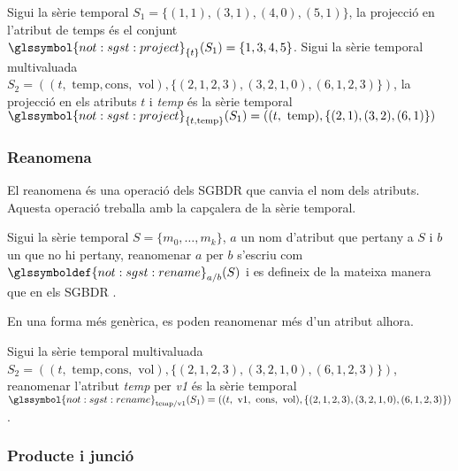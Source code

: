 \begin{example}
  Sigui la sèrie temporal $S_1=\{(1,1),(3,1),(4,0),(5,1)\}$, la
  projecció en l'atribut de temps és el conjunt
  $\glssymbol{not:sgst:project}_{\{t\}}(S_1) = \{ 1,3,4,5 \}$.  Sigui
  la sèrie temporal multivaluada $S_2 = ( (t,\text{ temp},\text{
    cons},\text{ vol}),\{ (2,1,2,3), (3,2,1,0), (6,1,2,3) \})$, la
  projecció en els atributs $t$ i \emph{temp} és la sèrie temporal
  $\glssymbol{not:sgst:project}_{ \{t,\text{temp}\}}(S_1) = (
  (t,\text{ temp}),\{ (2,1), (3,2), (6,1) \})$
\end{example}







\subsubsection{Reanomena}

El reanomena és una operació dels \gls{SGBDR} que canvia el nom dels
atributs.  Aquesta operació treballa amb la
capçalera de la sèrie temporal.


\begin{definition}[Reanomena]
  Sigui la sèrie temporal $S=\{ m_0,\dotsc,m_k\}$, $a$ un nom
  d'atribut que pertany a $S$ i $b$ un que no hi pertany, reanomenar
  $a$ per $b$ s'escriu com $\glssymboldef{not:sgst:rename}_{a/b} (S)$
  i es defineix de la mateixa manera que en els
  \gls{SGBDR} \parencite[cap.~7]{date04:introduction8}.
\end{definition}

En una forma més genèrica, es poden reanomenar més d'un atribut
alhora.

\begin{example}
  Sigui la sèrie temporal multivaluada $S_2 = ( (t,\text{ temp},\text{
    cons},\text{ vol}),\{ (2,1,2,3), (3,2,1,0), (6,1,2,3) \})$, reanomenar 
  l'atribut \emph{temp} per \emph{v1} és la sèrie temporal
  $\glssymbol{not:sgst:rename}_{\text{temp}/\text{v1}}(S_1) = ( (t,\text{ v1},\text{
    cons},\text{ vol}),\{ (2,1,2,3), (3,2,1,0), (6,1,2,3) \})$.
\end{example}



\subsubsection{Producte i junció}

